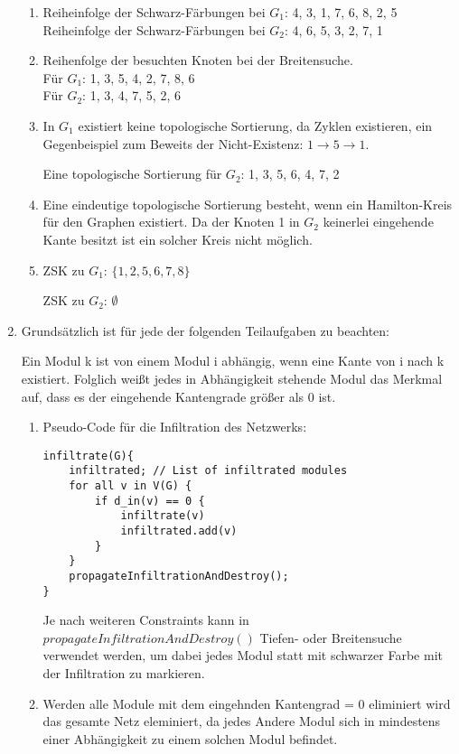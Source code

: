 \documentclass{article}
\begin{document}
\begin{enumerate}[\bfseries1.]
\begin{enumerate}
      \item %
      Reiheinfolge der Schwarz-Färbungen bei $G_1$: 4, 3, 1, 7, 6, 8, 2, 5
      \\Reiheinfolge der Schwarz-Färbungen bei $G_2$: 4, 6, 5, 3, 2, 7, 1
      
      \item%
      Reihenfolge der besuchten Knoten bei der Breitensuche.
      \\Für $G_1$: 1, 3, 5, 4, 2, 7, 8, 6
      \\Für $G_2$: 1, 3, 4, 7, 5, 2, 6
      \item %
      In $G_1$ existiert keine topologische Sortierung, da Zyklen existieren,
      ein Gegenbeispiel zum Beweits der Nicht-Existenz: 
      $ 1 \rightarrow 5 \rightarrow 1$.
      
      Eine topologische Sortierung für $G_2$: 1, 3, 5, 6, 4, 7, 2
      
      \item %
      Eine eindeutige topologische Sortierung besteht, wenn ein Hamilton-Kreis
      für den Graphen existiert. Da der Knoten 1 in $G_2$ keinerlei eingehende
      Kante besitzt ist ein solcher Kreis nicht möglich. 
      
      \item %
        ZSK zu $G_1$: $\{1, 2, 5, 6, 7, 8\}$
        
        ZSK zu $G_2$: $\emptyset$
    \end{enumerate}
    
\newpage
\item   
    Grundsätzlich ist für jede der folgenden Teilaufgaben zu beachten:
    
    Ein Modul k ist von einem Modul i abhängig, wenn eine Kante von i
    nach k existiert. Folglich weißt jedes in Abhängigkeit stehende
    Modul das Merkmal auf, dass es der eingehende Kantengrade größer als
    0 ist. 
    
    \begin{enumerate}
\item %
        Pseudo-Code für die Infiltration des Netzwerks:
\begin{verbatim}
infiltrate(G){
    infiltrated; // List of infiltrated modules
    for all v in V(G) {
        if d_in(v) == 0 {
            infiltrate(v)
            infiltrated.add(v)
        }
    }
    propagateInfiltrationAndDestroy();
}
\end{verbatim}
        Je nach weiteren Constraints kann in $propagateInfiltrationAndDestroy()$
        Tiefen- oder Breitensuche verwendet werden, um dabei jedes Modul statt
        mit schwarzer Farbe mit der Infiltration zu markieren.
        \item %
            Werden alle Module mit dem eingehnden Kantengrad = 0 eliminiert wird
            das gesamte Netz eleminiert, da jedes Andere Modul sich in
            mindestens einer Abhängigkeit zu einem solchen Modul befindet. 
            

\end{enumerate}
\end{enumerate}
\end{document}
